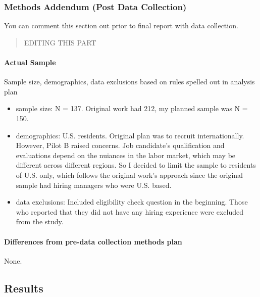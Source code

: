 \documentclass[]{article}
\let\oldparagraph\paragraph
\renewcommand{\paragraph}[1]{\oldparagraph{#1}\mbox{}}
\begin{document}
\hypertarget{methods-addendum-post-data-collection}{%
\subsubsection{Methods Addendum (Post Data
Collection)}\label{methods-addendum-post-data-collection}}

You can comment this section out prior to final report with data
collection.

\begin{quote}
EDITING THIS PART
\end{quote}

\hypertarget{actual-sample}{%
\paragraph{Actual Sample}\label{actual-sample}}

Sample size, demographics, data exclusions based on rules spelled out in
analysis plan

\begin{itemize}
\item
  sample size: N = 137. Original work had 212, my planned sample was N =
  150.
\item
  demographics: U.S. residents. Original plan was to recruit
  internationally. However, Pilot B raised concerns. Job candidate's
  qualification and evaluations depend on the nuiances in the labor
  market, which may be different across different regions. So I decided
  to limit the sample to residents of U.S. only, which follows the
  original work's approach since the original sample had hiring managers
  who were U.S. based.
\item
  data exclusions: Included eligibility check question in the beginning.
  Those who reported that they did not have any hiring experience were
  excluded from the study.
\end{itemize}

\hypertarget{differences-from-pre-data-collection-methods-plan}{%
\paragraph{Differences from pre-data collection methods
plan}\label{differences-from-pre-data-collection-methods-plan}}

None.\\

\hypertarget{results}{%
\subsection{Results}\label{results}}
\end{document}
